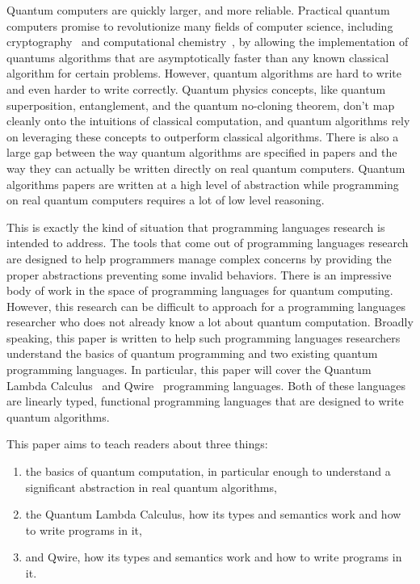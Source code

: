 Quantum computers are quickly larger, and more reliable\cite{quantsup}.
Practical quantum computers promise to revolutionize many fields of computer science, including cryptography~\cite{crypto} and computational chemistry~\cite{qchem}, by allowing the implementation of quantums algorithms that are asymptotically faster than any known classical algorithm for certain problems.
However, quantum algorithms are hard to write and even harder to write correctly.
Quantum physics concepts, like quantum superposition, entanglement, and the quantum no-cloning theorem, don't map cleanly onto the intuitions of classical computation, and quantum algorithms rely on leveraging these concepts to outperform classical algorithms.
There is also a large gap between the way quantum algorithms are specified in papers and the way they can actually be written directly on real quantum computers.
Quantum algorithms papers are written at a high level of abstraction while programming on real quantum computers requires a lot of low level reasoning.

This is exactly the kind of situation that programming languages research is intended to address.
The tools that come out of programming languages research are designed to help programmers manage complex concerns by providing the proper abstractions preventing some invalid behaviors.
There is an impressive body of work in the space of programming languages for quantum computing.
However, this research can be difficult to approach for a programming languages researcher who does not already know a lot about quantum computation.
Broadly speaking, this paper is written to help such programming languages researchers understand the basics of quantum programming and two existing quantum programming languages.
In particular, this paper will cover the Quantum Lambda Calculus~\cite{qlc} and Qwire~\cite{qwire} programming languages.
Both of these languages are linearly typed, functional programming languages that are designed to write quantum algorithms.

This paper aims to teach readers about three things:
\begin{enumerate}
    \item the basics of quantum computation, in particular enough to understand a significant abstraction in real quantum algorithms,
    \item the Quantum Lambda Calculus, how its types and semantics work and how to write programs in it,
    \item and Qwire, how its types and semantics work and how to write programs in it.
\end{enumerate}